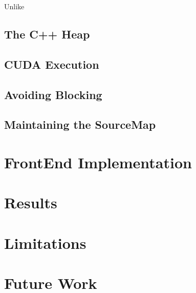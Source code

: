 \documentclass[nocopyrightspace]{sigchi}
\begin{document}
Unlike

\subsection{The C++ Heap}

\subsection{CUDA Execution}


\subsection{Avoiding Blocking}

\subsection{Maintaining the SourceMap}


\section{FrontEnd Implementation}



\section{Results}



\section{Limitations}

\section{Future Work}



\end{document}

